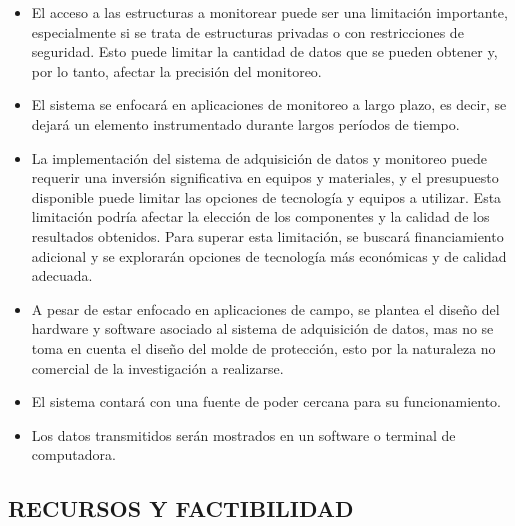 \documentclass[12pt,letterpaper]{article}
\newcommand{\newfig}[4]{%
\begin{figure}[H]%
\centering%
\texttt{[image: \#2]}%
\caption{\emph{\small{#3}}}%
\label{fig:#4}
\end{figure}%
}
\begin{document}
	\begin{itemize}

	\item El acceso a las estructuras a monitorear puede ser una limitación importante, especialmente si se trata de estructuras privadas o con restricciones de seguridad. Esto puede limitar la cantidad de datos que se pueden obtener y, por lo tanto, afectar la precisión del monitoreo.
	\item El sistema se enfocará en aplicaciones de monitoreo a largo plazo, es decir, se dejará un elemento instrumentado durante largos períodos de tiempo.
	\item La implementación del sistema de adquisición de datos y monitoreo puede requerir una inversión significativa en equipos y materiales, y el presupuesto disponible puede limitar las opciones de tecnología y equipos a utilizar. Esta limitación podría afectar la elección de los componentes y la calidad de los resultados obtenidos. Para superar esta limitación, se buscará financiamiento adicional y se explorarán opciones de tecnología más económicas y de calidad adecuada.

	\item A pesar de estar enfocado en aplicaciones de campo, se plantea el diseño del hardware y software asociado al sistema de adquisición de datos, mas no se toma en cuenta el diseño del molde de protección, esto por la naturaleza no comercial de la investigación a realizarse.

	\item El sistema contará con una fuente de poder cercana para su funcionamiento.
	
	\item Los datos transmitidos serán mostrados en un software o terminal de computadora.

		
	\end{itemize}




	\newpage
	
	\begin{center}		
		\section*{ RECURSOS Y FACTIBILIDAD}	
	\end{center}
\end{document}
